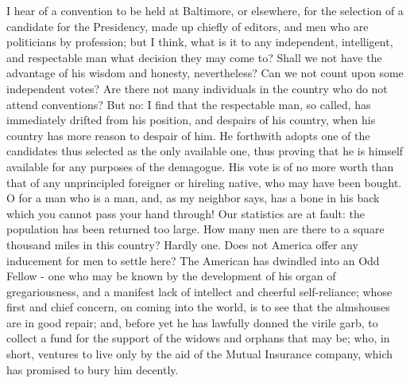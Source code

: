 \documentclass[letterpaper,12pt,english]{sphinxmanual}
\begin{document}
I hear of a convention to be held at Baltimore, or elsewhere, for the selection of a candidate for the Presidency, made up chiefly of editors, and men who are politicians by profession; but I think, what is it to any independent, intelligent, and respectable man what decision they may come to? Shall we not have the advantage of his wisdom and honesty, nevertheless? Can we not count upon some independent votes? Are there not many individuals in the country who do not attend conventions? But no: I find that the respectable man, so called, has immediately drifted from his position, and despairs of his country, when his country has more reason to despair of him. He forthwith adopts one of the candidates thus selected as the only available one, thus proving that he is himself available for any purposes of the demagogue. His vote is of no more worth than that of any unprincipled foreigner or hireling native, who may have been bought. O for a man who is a man, and, as my neighbor says, has a bone in his back which you cannot pass your hand through! Our statistics are at fault: the population has been returned too large. How many men are there to a square thousand miles in this country? Hardly one. Does not America offer any inducement for men to settle here? The American has dwindled into an Odd Fellow - one who may be known by the development of his organ of gregariousness, and a manifest lack of intellect and cheerful self-reliance; whose first and chief concern, on coming into the world, is to see that the almshouses are in good repair; and, before yet he has lawfully donned the virile garb, to collect a fund for the support of the widows and orphans that may be; who, in short, ventures to live only by the aid of the Mutual Insurance company, which has promised to bury him decently.
\end{document}
